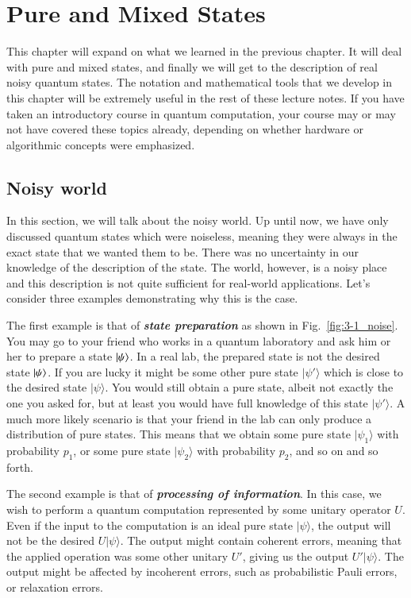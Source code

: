 \chapter[Pure and Mixed States]{Pure and Mixed States}
\label{sec:3_pure_mixed}

This chapter will expand on what we learned in the previous chapter.
It will deal with pure and mixed states, and finally we will get to the description of real noisy quantum states.
The notation and mathematical tools that we develop in this chapter will be extremely useful in the rest of these lecture notes. If you have taken an introductory course in quantum computation, your course may or may not have covered these topics already, depending on whether hardware or algorithmic concepts were emphasized.

\section{Noisy world}
\label{sec:3-1_noisy_world}

In this section, we will talk about the noisy world.
Up until now, we have only discussed quantum states which were noiseless, meaning they
were always in the exact state that we wanted them to be.
There was no uncertainty in our knowledge of the description of the state.
The world, however, is a noisy place and this description is not quite sufficient for real-world applications.
Let's consider three examples demonstrating why this is the case.

The first example is that of \textit{\textbf{state preparation}} as shown in Fig.~\ref{fig:3-1_noise}.
You may go to your friend who works in a quantum laboratory and ask him or her to prepare
a state $\left| \psi \right\rangle$.
In a real lab, the prepared state is not the desired state $\left| \psi \right\rangle$.
If you are lucky it might be some other pure state $|\psi'\rangle$ which is close to the desired state $|\psi\rangle$.
You would still obtain a pure state, albeit not exactly the one you asked for, but at least you would have full knowledge of this state $|\psi'\rangle$.
A much more likely scenario is that your friend in the lab can only produce a distribution of pure states.
This means that we obtain some pure state $|\psi_1\rangle$ with probability $p_1$, or some pure state $|\psi_2\rangle$ with probability $p_2$, and so on and so forth.

The second example is that of \textit{\textbf{processing of information}}.
In this case, we wish to perform a quantum computation represented by some unitary operator $U$.
Even if the input to the computation is an ideal pure state $|\psi\rangle$, the output will not be the desired $U|\psi\rangle$.
The output might contain coherent errors, meaning that the applied operation was some other unitary $U'$, giving us the output $U'|\psi\rangle$.
The output might be affected by incoherent errors, such as probabilistic Pauli errors, or relaxation errors.

